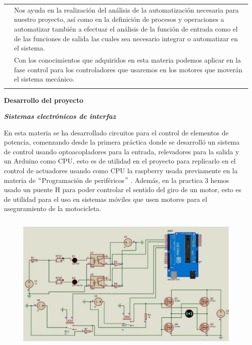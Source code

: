 \documentclass[12pt]{article}
\begin{document}
\begin{table}[H]
\begin{tabular}{p{1.26in}p{4.83in}}
\hhline{--}
\multicolumn{1}{|p{1.26in}}{\Centering {\fontsize{10pt}{12.0pt}\selectfont SISTEMAS ELECTRÓNICOS DE INTERFAZ}} & 
\multicolumn{1}{|p{4.83in}|}{Nos ayuda en la realización del análisis de la automatización necesaria para nuestro proyecto, así como en la definición de procesos y operaciones a automatizar también a efectuar el análisis de la función de entrada como el de las funciones de salida las cuales sea necesario integrar o automatizar en el sistema.} \\
\hhline{--}
\multicolumn{1}{|p{1.26in}}{\Centering {\fontsize{10pt}{12.0pt}\selectfont CONTROLADORES LÓGICOS PROGRAMABLES}} & 
\multicolumn{1}{|p{4.83in}|}{{\fontsize{10pt}{12.0pt}\selectfont  }Con los conocimientos que adquiridos en esta materia podemos aplicar en la fase control para los controladores que usaremos en los motores que moverán el sistema mecánico.} \\
\hhline{--}

\end{tabular}
 \end{table}

\newpage


\vspace{\baselineskip}
\textbf{Desarrollo del proyecto }\par

\textbf{\textit{Sistemas electrónicos de interfaz }}\par

En esta materia se ha desarrollado circuitos para el control de elementos de potencia, comenzando desde la primera práctica donde se desarrolló un sistema de control usando optoacopladores para la entrada, relevadores para la salida y un Arduino como CPU, esto es de utilidad en el proyecto para replicarlo en el control de actuadores usando como CPU la raspberry usada previamente en la materia de $``$Programación de periféricos$"$ . Además, en la practica 3 hemos usado un puente H para poder controlar el sentido del giro de un motor, esto es de utilidad para el uso en sistemas móviles que usen motores para el aseguramiento de la motocicleta.\par





\begin{figure}[H]
\advance\leftskip 1.15in		\includegraphics[width=4.91in,height=2.73in]{./media/image4.jpeg}
\end{figure}
\end{document}
